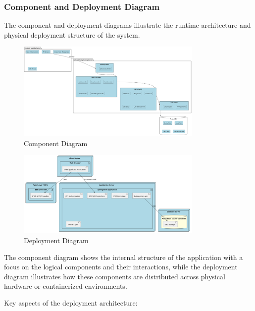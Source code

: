 \documentclass[a4paper,10pt]{article}
\begin{document}
        \subsubsection{Component and Deployment Diagram}
            The component and deployment diagrams illustrate the runtime architecture and physical deployment structure of the system.

            \begin{figure}[h]
            \centering
            \includegraphics[width=0.8\textwidth]{component_diagram}
            \caption{Component Diagram}
            \end{figure}

            \begin{figure}[h]
            \centering
            \includegraphics[width=0.8\textwidth]{deployment_diagram}
            \caption{Deployment Diagram}
            \end{figure}

            The component diagram shows the internal structure of the application with a focus on the logical components and their interactions, while the deployment diagram illustrates how these components are distributed across physical hardware or containerized environments.

            Key aspects of the deployment architecture:
\end{document}
